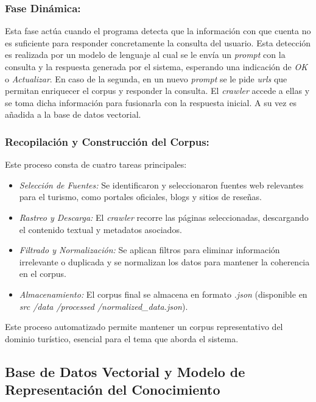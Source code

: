 \documentclass[10pt]{llncs}
\begin{document}
\subsubsection{Fase Dinámica:} Esta fase actúa cuando el programa detecta que la información con que cuenta no es suficiente para responder concretamente la consulta del usuario. Esta detección es realizada por un modelo de 
lenguaje al cual se le envía un \textit{prompt} con la consulta y la respuesta generada por el sistema, esperando una indicación de \textit{OK} o \textit{Actualizar}. En caso de la segunda, en un nuevo \textit{prompt} se le pide 
\textit{urls} que permitan enriquecer el corpus y responder la consulta. El \textit{crawler} accede a ellas y se toma dicha información para fusionarla con la respuesta inicial. A su vez es añadida a la base de datos 
vectorial.

\subsubsection{Recopilación y Construcción del Corpus:} Este proceso consta de cuatro tareas principales:

\begin{itemize}
    \item \textit{Selección de Fuentes:} Se identificaron y seleccionaron fuentes web relevantes para el turismo, como portales oficiales, blogs y sitios de reseñas.
    \item \textit{Rastreo y Descarga:} El \textit{crawler} recorre las páginas seleccionadas, descargando el contenido textual y metadatos asociados.
    \item \textit{Filtrado y Normalización:} Se aplican filtros para eliminar información irrelevante o duplicada y se normalizan los datos para mantener la coherencia en el corpus.
    \item \textit{Almacenamiento:} El corpus final se almacena en formato \textit{.json} (disponible en \textit{src /data /processed /normalized\_data.json}).
\end{itemize}

Este proceso automatizado permite mantener un corpus representativo del dominio turístico, esencial para el tema que aborda el sistema.

\vspace{\baselineskip}
\subsection{Base de Datos Vectorial y Modelo de Representación del Conocimiento}
\end{document}
